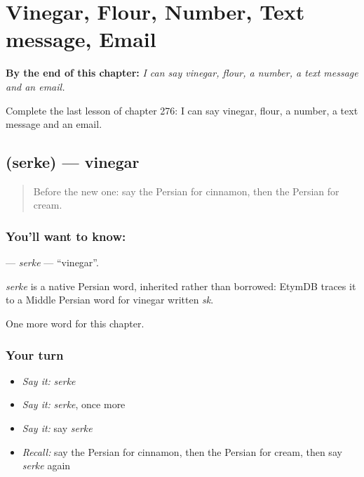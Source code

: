 
\chapter{Vinegar, Flour, Number, Text message, Email}
\label{ch:fa-vinegar-flour-number-text-message-email}

\begin{chapteropening}
\textbf{By the end of this chapter:} \emph{I can say vinegar, flour, a number, a text message and an email.}

Complete the last lesson of chapter 276: I can say vinegar, flour, a number, a text message and an email.
\end{chapteropening}

\section[\texorpdfstring{\fa{سرکه} (serke)}{سرکه (serke)}]{ (serke) — vinegar}

\label{lesson:FA-C276-serke}



\begin{quote}
Before the new one: say the Persian for cinnamon, then the Persian for cream.
\end{quote}

\subsection*{You'll want to know: }
\textbf{} — \emph{serke} — \textquotedblleft{}vinegar\textquotedblright{}.

\begin{cousinweb}
\emph{serke} is a native Persian word, inherited rather than borrowed: EtymDB traces it to a Middle Persian word for vinegar written \emph{sk}.
\end{cousinweb}

\begin{grammarlens}[title={What you've built}]
One more word for this chapter.
\end{grammarlens}

\subsection*{Your turn}
\begin{itemize}
\raggedright
  \item \emph{Say it:} \emph{serke}
  \item \emph{Say it:} \emph{serke}, once more
  \item \emph{Say it:} say \emph{serke}
  \item \emph{Recall:} say the Persian for cinnamon, then the Persian for cream, then say \emph{serke} again
\end{itemize}


